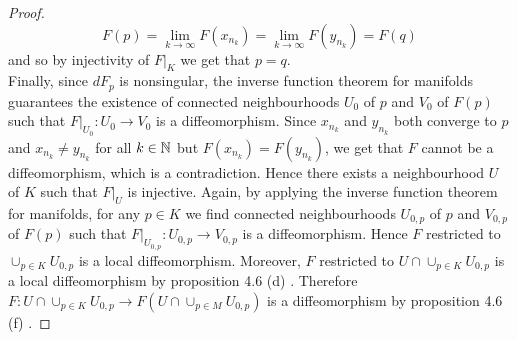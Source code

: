 \begin{proof}
	\begin{equation*}
		F(p) = \lim_{k \to \infty} F(x_{n_k}) = \lim_{k \to \infty}F(y_{n_k}) = F(q)
	\end{equation*}
	\noindent and so by injectivity of $F\vert_K$ we get that $p = q$.\\
	Finally, since $dF_p$ is nonsingular, the inverse function theorem for manifolds \cite[79]{lee:smooth_manifolds:2013} guarantees the existence of connected neighbourhoods $U_0$ of $p$ and $V_0$ of $F(p)$ such that $F\vert_{U_0} : U_0 \to V_0$ is a diffeomorphism. Since $x_{n_k}$ and $y_{n_k}$ both converge to $p$ and $x_{n_k} \neq y_{n_k}$ for all $k \in \mathbb{N}$ but $F(x_{n_k}) = F(y_{n_k})$, we get that $F$ cannot be a diffeomorphism, which is a contradiction. Hence there exists a neighbourhood $U$ of $K$ such that $F\vert_U$ is injective. Again, by applying the inverse function theorem for manifolds, for any $p \in K$ we find connected neighbourhoods $U_{0,p}$ of $p$ and $V_{0,p}$ of $F(p)$ such that $F\vert_{U_{0,p}} : U_{0,p} \to V_{0,p}$ is a diffeomorphism. Hence $F$ restricted to $\cup_{p \in K} U_{0,p}$ is a local diffeomorphism. Moreover, $F$ restricted to $U \cap \cup_{p \in K} U_{0,p}$ is a local diffeomorphism by proposition 4.6 (d) \cite[80]{lee:smooth_manifolds:2013}. Therefore $F : U \cap \cup_{p \in K} U_{0,p} \to F(U \cap \cup_{p \in M}U_{0,p})$ is a diffeomorphism by proposition 4.6 (f) \cite[80]{lee:smooth_manifolds:2013}.
\end{proof}


